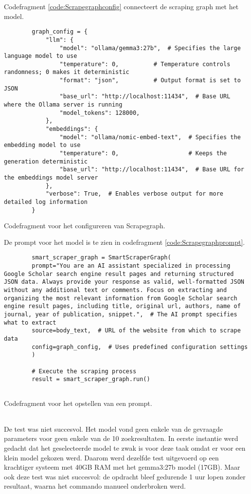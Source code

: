 Codefragment \ref{code:Scrapegraphconfig} connecteert de scraping graph met het model.
\begin{listing}
    \begin{verbatim}
        graph_config = {
            "llm": {
                "model": "ollama/gemma3:27b",  # Specifies the large language model to use
                "temperature": 0,          # Temperature controls randomness; 0 makes it deterministic
                "format": "json",          # Output format is set to JSON
                "base_url": "http://localhost:11434",  # Base URL where the Ollama server is running
                "model_tokens": 128000,
            },
            "embeddings": {
                "model": "ollama/nomic-embed-text",  # Specifies the embedding model to use
                "temperature": 0,                    # Keeps the generation deterministic
                "base_url": "http://localhost:11434",  # Base URL for the embeddings model server
            },
            "verbose": True,  # Enables verbose output for more detailed log information
        }
    \end{verbatim}
    \caption[Scrapegraph configuratie codefragment]{Codefragment voor het configureren van Scrapegraph.}
    \label{code:Scrapegraphconfig}
\end{listing}
De prompt voor het model is te zien in codefragment \ref{code:Scrapegraphprompt}.
\begin{listing}
    \begin{verbatim}
        smart_scraper_graph = SmartScraperGraph(
        prompt="You are an AI assistant specialized in processing Google Scholar search engine result pages and returning structured JSON data. Always provide your response as valid, well-formatted JSON without any additional text or comments. Focus on extracting and organizing the most relevant information from Google Scholar search engine result pages, including title, original url, authors, name of journal, year of publication, snippet.",  # The AI prompt specifies what to extract
        source=body_text,  # URL of the website from which to scrape data
        config=graph_config,  # Uses predefined configuration settings
        )
        
        # Execute the scraping process
        result = smart_scraper_graph.run()
        
    \end{verbatim}
    \caption[Prompt codefragment]{Codefragment voor het opstellen van een prompt.}
    \label{code:Scrapegraphprompt}
\end{listing}
\\
De test was niet succesvol. Het model vond geen enkele van de gevraagde parameters voor geen enkele van de 10 zoekresultaten.
In eerste instantie werd gedacht dat het geselecteerde model te zwak is voor deze taak omdat er voor een klein model gekozen werd. Daarom werd dezelfde test uitgevoerd op een krachtiger systeem met 40GB RAM met het gemma3:27b model (17GB). Maar ook deze test was niet succesvol: de opdracht bleef gedurende 1 uur lopen zonder resultaat, waarna het commando manueel onderbroken werd. 
